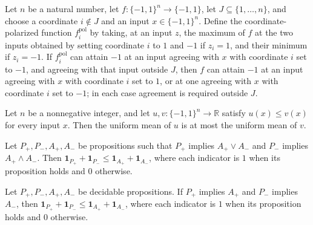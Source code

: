\begin{theorem}
\label{FABL.coalitionCanAttain_coordinatePolarization_neg_one_set_neg_one_imp}
\leanok
{}
Let $n$ be a natural number, let $f\colon\{−1,1\}^n\to\{−1,1\}$, let
$J\subseteq\{1,\ldots,n\}$, and choose a coordinate $i\notin J$ and an input
$x\in\{−1,1\}^n$. Define the coordinate-polarized function $f_i^{\mathrm{pol}}$ by
taking, at an input $z$, the maximum of $f$ at the two inputs obtained by setting
coordinate $i$ to $1$ and $-1$ if $z_i=1$, and their minimum if $z_i=-1$. If
$f_i^{\mathrm{pol}}$ can attain $-1$ at an input agreeing with $x$ with coordinate $i$
set to $-1$, and agreeing with that input outside $J$, then $f$ can attain $-1$ at an
input agreeing with $x$ with coordinate $i$ set to $1$, or at one agreeing with $x$ with
coordinate $i$ set to $-1$; in each case agreement is required outside $J$.
\end{theorem}

\begin{theorem}
\label{FABL.mean_le_mean_of_pointwise}
\leanok
{}
Let $n$ be a nonnegative integer, and let $u,v:\{−1,1\}^n\to\mathbb R$ satisfy $u(x)\le
v(x)$ for every input $x$. Then the uniform mean of $u$ is at most the uniform mean of
$v$.
\end{theorem}

\begin{theorem}
\label{FABL.indicator_pair_le_of_union_inter}
\leanok
{}
Let $P_+,P_-,A_+,A_-$ be propositions such that $P_+$ implies $A_+\vee A_-$ and $P_-$
implies $A_+\wedge A_-$. Then $\mathbf{1}_{P_+}+\mathbf{1}_{P_-}\leq
\mathbf{1}_{A_+}+\mathbf{1}_{A_-}$, where each indicator is $1$ when its proposition
holds and $0$ otherwise.
\end{theorem}

\begin{theorem}
\label{FABL.indicator_pair_le_of_imp}
\leanok
{}
Let $P_+,P_-,A_+,A_-$ be decidable propositions. If $P_+$ implies $A_+$ and $P_-$
implies $A_-$, then $\mathbf 1_{P_+}+\mathbf 1_{P_-}\leq\mathbf 1_{A_+}+\mathbf
1_{A_-}$, where each indicator is $1$ when its proposition holds and $0$ otherwise.
\end{theorem}

